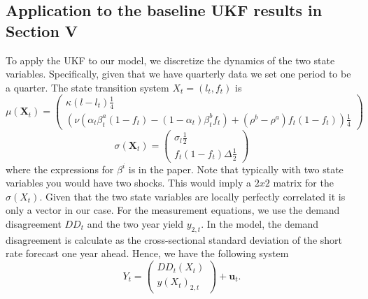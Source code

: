 \subsection{Application to the baseline UKF results in Section V}
To apply the UKF to our model, we discretize the dynamics of the two state variables. Specifically, given that we have quarterly data we set one period to be a quarter. The state transition system $X_t = \left(l_t, f_t\right)$ is
\begin{equation}
    \mu(\mathbf{X}_t) = \begin{pmatrix}
        \kappa (l - l_t) \frac{1}{4} \\
        \left(\nu \left( \alpha_t \beta^a_t (1 - f_t) - (1 - \alpha_t) \beta^b_t f_t \right) + (\rho^b - \rho^a) f_t (1 - f_t) \right) \frac{1}{4}
    \end{pmatrix}
\end{equation}
\begin{equation}
    \sigma(\mathbf{X}_t) = \begin{pmatrix}
        \sigma_l \frac{1}{2}  \\
        f_t (1 - f_t) \Delta \frac{1}{2} 
    \end{pmatrix}
\end{equation}
where the expressions for $\beta^i$ is in the paper. Note that typically with two state variables you would have two shocks. This would imply a $2x2$ matrix for the $\sigma\left(X_t\right)$. Given that the two state variables are locally perfectly correlated it is only a vector in our case. For the measurement equations, we use the demand disagreement $DD_t$ and the two year yield $y_{2,t}$. In the model, the demand disagreement is calculate as the cross-sectional standard deviation of the short rate forecast one year ahead. Hence, we have the following system
\begin{equation}
    Y_t =  \begin{pmatrix}
     DD_t\left(X_t\right)  \\
       y\left(X_t\right)_{2,t} 
    \end{pmatrix}
    + \mathbf{u}_t.
\end{equation}
